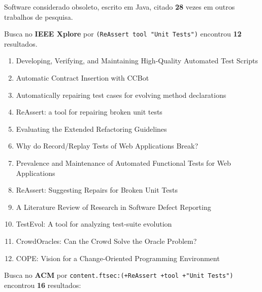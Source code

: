 Software considerado obsoleto,
escrito em Java,
citado {\bf 28} vezes em outros trabalhos de pesquisa.

Busca no {\bf IEEE Xplore} por
\texttt{(ReAssert tool "Unit Tests")}
encontrou {\bf 12}
resultados.

\begin{enumerate}
\item Developing, Verifying, and Maintaining High-Quality Automated Test Scripts
\item Automatic Contract Insertion with CCBot
\item Automatically repairing test cases for evolving method declarations
\item ReAssert: a tool for repairing broken unit tests
\item Evaluating the Extended Refactoring Guidelines
\item Why do Record/Replay Tests of Web Applications Break?
\item Prevalence and Maintenance of Automated Functional Tests for Web Applications
\item ReAssert: Suggesting Repairs for Broken Unit Tests
\item A Literature Review of Research in Software Defect Reporting
\item TestEvol: A tool for analyzing test-suite evolution
\item CrowdOracles: Can the Crowd Solve the Oracle Problem?
\item COPE: Vision for a Change-Oriented Programming Environment
\end{enumerate}

Busca no {\bf ACM} por
\texttt{content.ftsec:(+ReAssert +tool +"Unit Tests")}
encontrou {\bf 16}
resultados:


